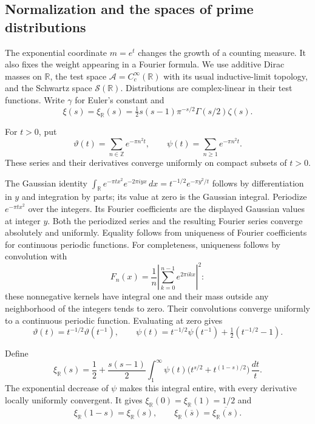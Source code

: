 \subsection{Normalization and the spaces of prime distributions}
\label{v4-arith:pm:chapter}

The exponential coordinate $m=e^t$ changes the growth of a counting
measure. It also fixes the weight appearing in a Fourier formula.
We use additive Dirac masses on $\mathbb R$, the test space
$\mathscr A=C_c^\infty(\mathbb R)$ with its usual inductive-limit
topology, and the Schwartz space $\mathscr S(\mathbb R)$.
Distributions are complex-linear in their test functions.
Write $\gamma$ for Euler's constant and
\[
 \xi(s)=\xi_{\mathbb R}(s)
   =\tfrac12s(s-1)\pi^{-s/2}\Gamma(s/2)\zeta(s).
\]

For $t>0$, put
\[
 \vartheta(t)=\sum_{n\in\mathbb Z}e^{-\pi n^2t},\qquad
 \psi(t)=\sum_{n\geq1}e^{-\pi n^2t}.
\]
These series and their derivatives converge uniformly on compact
subsets of $t>0$.

The Gaussian identity
$\int_{\mathbb R}e^{-\pi t x^2}e^{-2\pi i yx}\,dx
=t^{-1/2}e^{-\pi y^2/t}$ follows by differentiation in $y$ and
integration by parts; its value at zero is the Gaussian integral.
Periodize $e^{-\pi t x^2}$ over the integers. Its Fourier coefficients
are the displayed Gaussian values at integer $y$. Both the
periodized series and the resulting Fourier series converge
absolutely and uniformly. Equality follows from uniqueness of
Fourier coefficients for continuous periodic functions. For
completeness, uniqueness follows by convolution with
\[
 F_n(x)=\frac1n\left|\sum_{k=0}^{n-1}e^{2\pi i kx}\right|^2:
\]
these nonnegative kernels have integral one and their mass outside
any neighborhood of the integers tends to zero. Their convolutions
converge uniformly to a continuous periodic function. Evaluating
at zero gives
\[
 \vartheta(t)=t^{-1/2}\vartheta(t^{-1}),\qquad
 \psi(t)=t^{-1/2}\psi(t^{-1})+\tfrac12(t^{-1/2}-1).
\]

Define
\begin{equation}
 \xi_{\mathbb R}(s)=\frac12+
 \frac{s(s-1)}2\int_1^\infty
 \psi(t)\bigl(t^{s/2}+t^{(1-s)/2}\bigr)\,\frac{dt}{t}.
 \label{v4-arith:mo:xi-integral}
\end{equation}
The exponential decrease of $\psi$ makes this integral entire,
with every derivative locally uniformly convergent. It gives
$\xi_{\mathbb R}(0)=\xi_{\mathbb R}(1)=1/2$ and
\[
 \xi_{\mathbb R}(1-s)=\xi_{\mathbb R}(s),\qquad
 \xi_{\mathbb R}(\overline s)=\overline{\xi_{\mathbb R}(s)}.
\]

